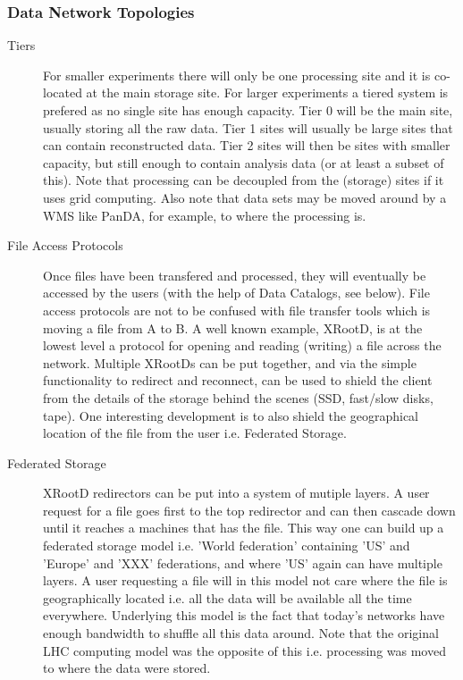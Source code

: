 \subsubsection{Data Network Topologies}

\begin{description}
\item[Tiers] For smaller experiments there will only be one processing site and it is co-located at the main storage site. For larger experiments 
a tiered system is prefered as no single site has enough capacity. Tier 0 will be the main site, usually storing all the raw data. Tier 1 sites will 
usually be large sites that can contain reconstructed data. Tier 2 sites will then be sites with smaller capacity, but still enough to contain 
analysis data (or at least a subset of this). Note that processing can be decoupled from the (storage) sites if it uses grid computing. Also note 
that data sets may be moved around by a WMS like PanDA, for example, to where the processing is.  

\item[File Access Protocols] Once files have been transfered and processed, they will eventually be accessed by the users (with the help of 
Data Catalogs, see below). File access protocols are not to be confused with file transfer tools which is moving a file from A to B. 
A well known example, XRootD, is at the lowest level a protocol for opening and reading (writing) a file across the network. Multiple XRootDs can 
be put together, and via the simple functionality to redirect and reconnect, can be used to shield the client from the details of the storage 
behind the scenes (SSD, fast/slow disks, tape). One interesting development is to also shield the geographical location of the file from the user i.e. 
Federated Storage.

\item[Federated Storage] XRootD redirectors can be put into a system of mutiple layers. A user request for a file goes first to the top 
redirector and can then cascade down until it reaches a machines that has the file. This way one can build up a federated storage model i.e. 
'World federation' containing 'US' and 'Europe' and 'XXX' federations, and where 'US' again can have multiple layers. A user requesting a file 
will in this model not care where the file is geographically located i.e. all the data will be available all the time everywhere. Underlying this 
model is the fact that today's networks have enough bandwidth to shuffle all this data around. 
Note that the original LHC computing model was the opposite of this i.e. processing was moved to where the data were stored.
\end{description}


